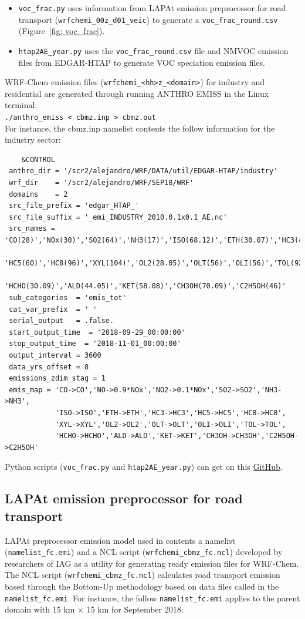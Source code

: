 \begin{itemize}
	\item \verb|voc_frac.py| uses information from LAPAt emission preprocessor for road transport (\verb|wrfchemi_00z_d01_veic|) to generate a  \verb|voc_frac_round.csv| (Figure~\ref{fig: voc_frac}).
	\item \verb|htap2AE_year.py| uses the \verb|voc_frac_round.csv| file and NMVOC emission files from EDGAR-HTAP to generate VOC speciation emission files.
\end{itemize}

WRF-Chem emission files (\verb|wrfchemi_<hh>z_<domain>|) for industry and residential are generated through running ANTHRO EMISS in the Linux terminal:\\
\verb|./anthro_emiss < cbmz.inp > cbmz.out| \\
For instance, the cbmz.inp namelist contents the follow information for the industry sector:

{\scriptsize
\begin{verbatim}
	&CONTROL
 anthro_dir = '/scr2/alejandro/WRF/DATA/util/EDGAR-HTAP/industry'
 wrf_dir    = '/scr2/alejandro/WRF/SEP18/WRF'
 domains    = 2
 src_file_prefix = 'edgar_HTAP_'
 src_file_suffix = '_emi_INDUSTRY_2010.0.1x0.1_AE.nc'
 src_names = 'CO(28)','NOx(30)','SO2(64)','NH3(17)','ISO(68.12)','ETH(30.07)','HC3(42.66)',
             'HC5(60)','HC8(96)','XYL(104)','OL2(28.05)','OLT(56)','OLI(56)','TOL(92)',
             'HCHO(30.09)','ALD(44.05)','KET(58.08)','CH3OH(70.09)','C2H5OH(46)'
 sub_categories  = 'emis_tot'
 cat_var_prefix  = ' '
 serial_output   = .false.
 start_output_time  = '2018-09-29_00:00:00'
 stop_output_time  = '2018-11-01_00:00:00'
 output_interval = 3600
 data_yrs_offset = 8
 emissions_zdim_stag = 1
 emis_map = 'CO->CO','NO->0.9*NOx','NO2->0.1*NOx','SO2->SO2','NH3->NH3',
            'ISO->ISO','ETH->ETH','HC3->HC3','HC5->HC5','HC8->HC8',
            'XYL->XYL','OL2->OL2','OLT->OLT','OLI->OLI','TOL->TOL',
            'HCHO->HCHO','ALD->ALD','KET->KET','CH3OH->CH3OH','C2H5OH->C2H5OH'
\end{verbatim}}

Python scripts (\verb|voc_frac.py| and \verb|htap2AE_year.py|) can get on this \href{https://github.com/adelgadop/Master_Dissertation}{GitHub}.

\subsection{LAPAt emission preprocessor for road transport}
LAPAt preprocessor emission model used in \citet{Andrade2015} contents a namelist (\verb|namelist_fc.emi|) and a NCL script (\verb|wrfchemi_cbmz_fc.ncl|) developed by researchers of IAG as a utility for generating ready emission files for WRF-Chem.
The NCL script (\verb|wrfchemi_cbmz_fc.ncl|) calculates road transport emission based through the Bottom-Up methodology based on data files called in the \verb|namelist_fc.emi|.
For instance, the follow \verb|namelist_fc.emi| applies to the parent domain with 15 km $\times$ 15 km for September 2018:

